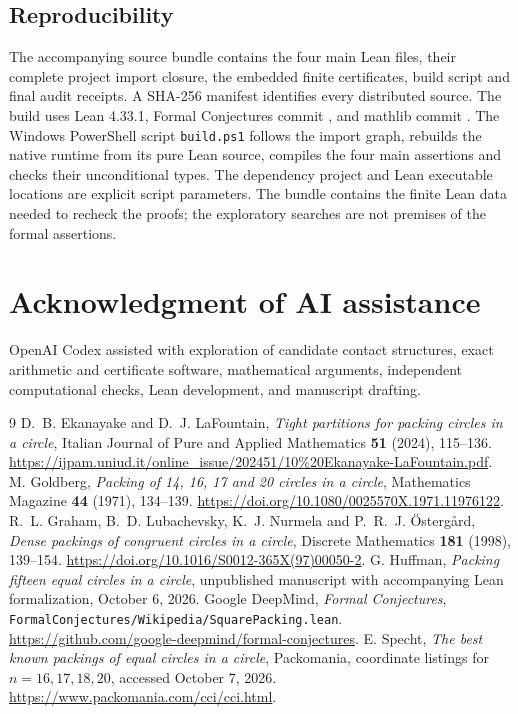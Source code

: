 \documentclass[11pt]{amsart}
\theoremstyle{definition}
\theoremstyle{remark}
\begin{document}
\subsection{Reproducibility}
The accompanying source bundle contains the four main Lean files, their
complete project import closure, the embedded finite certificates, build
script and final audit receipts. A SHA-256 manifest identifies every
distributed source. The build uses Lean 4.33.1, Formal Conjectures commit
, and mathlib commit
.
The Windows PowerShell script \texttt{build.ps1} follows the import graph,
rebuilds the native runtime from its pure Lean source, compiles the four
main assertions and checks their unconditional types. The dependency
project and Lean executable locations are explicit script parameters.
The bundle contains the finite Lean data needed to recheck the proofs;
the exploratory searches are not premises of the formal assertions.

\section*{Acknowledgment of AI assistance}
OpenAI Codex assisted with exploration of candidate contact structures,
exact arithmetic and certificate software, mathematical arguments,
independent computational checks, Lean development, and manuscript drafting.

\begin{thebibliography}{9}
 D.~B. Ekanayake and D.~J. LaFountain,
\emph{Tight partitions for packing circles in a circle},
Italian Journal of Pure and Applied Mathematics \textbf{51} (2024), 115--136.
\url{https://ijpam.uniud.it/online_issue/202451/10%20Ekanayake-LaFountain.pdf}.
 M. Goldberg,
\emph{Packing of 14, 16, 17 and 20 circles in a circle},
Mathematics Magazine \textbf{44} (1971), 134--139.
\url{https://doi.org/10.1080/0025570X.1971.11976122}.
 R.~L. Graham, B.~D. Lubachevsky, K.~J. Nurmela and P.~R.~J.
\"Osterg\aa rd, \emph{Dense packings of congruent circles in a circle},
Discrete Mathematics \textbf{181} (1998), 139--154.
\url{https://doi.org/10.1016/S0012-365X(97)00050-2}.
 G. Huffman, \emph{Packing fifteen equal circles in a circle},
unpublished manuscript with accompanying Lean formalization, October 6, 2026.
 Google DeepMind, \emph{Formal Conjectures},
\texttt{FormalConjectures/Wikipedia/SquarePacking.lean}.
\url{https://github.com/google-deepmind/formal-conjectures}.
 E. Specht, \emph{The best known packings of equal circles in a circle},
Packomania, coordinate listings for $n=16,17,18,20$, accessed October 7, 2026.
\url{https://www.packomania.com/cci/cci.html}.
\end{thebibliography}
\end{document}
